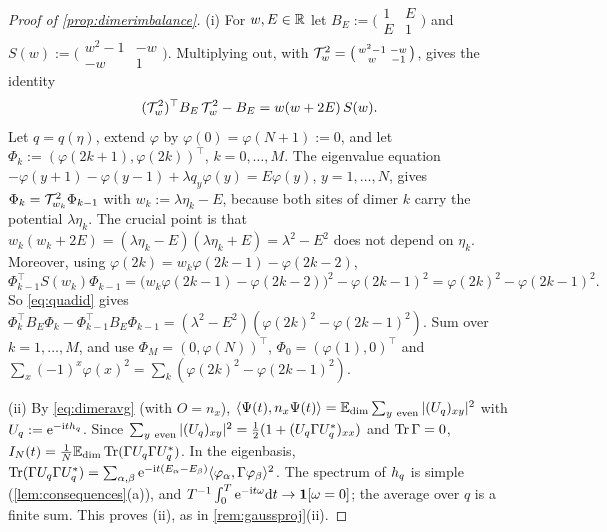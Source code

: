 \begin{proof}[Proof of \cref{prop:dimerimbalance}]
(i) For $w,E\in\mathbb{R}$ let $B_E:=\bigl(\begin{smallmatrix}1&E\\E&1\end{smallmatrix}\bigr)$ and
$S(w):=\bigl(\begin{smallmatrix}w^2-1&-w\\-w&1\end{smallmatrix}\bigr)$.  Multiplying out, with
$\mathcal{T}_w^2=\bigl(\begin{smallmatrix}w^2-1&-w\\w&-1\end{smallmatrix}\bigr)$, gives the identity
\begin{equation}\label{eq:quadid}
  (\mathcal{T}_w^2)^\top B_E\,\mathcal{T}_w^2-B_E=w(w+2E)\,S(w).
\end{equation}
Let $q=q(\eta)$, extend $\varphi$ by $\varphi(0)=\varphi(N+1):=0$, and let
$\Phi_k:=(\varphi(2k+1),\varphi(2k))^\top$, $k=0,\dots,M$.  The eigenvalue equation
$-\varphi(y+1)-\varphi(y-1)+\lambda q_y\varphi(y)=E\varphi(y)$, $y=1,\dots,N$, gives
$\Phi_k=\mathcal{T}_{w_k}^2\Phi_{k-1}$ with $w_k:=\lambda\eta_k-E$, because both sites of dimer $k$ carry the
potential $\lambda\eta_k$.  The crucial point is that $w_k(w_k+2E)=(\lambda\eta_k-E)(\lambda\eta_k+E)=\lambda^2-E^2$
does not depend on $\eta_k$.  Moreover, using $\varphi(2k)=w_k\varphi(2k-1)-\varphi(2k-2)$,
\[
  \Phi_{k-1}^\top S(w_k)\Phi_{k-1}=\bigl(w_k\varphi(2k-1)-\varphi(2k-2)\bigr)^2-\varphi(2k-1)^2=\varphi(2k)^2-\varphi(2k-1)^2 .
\]
So \eqref{eq:quadid} gives
$\Phi_k^\top B_E\Phi_k-\Phi_{k-1}^\top B_E\Phi_{k-1}=(\lambda^2-E^2)(\varphi(2k)^2-\varphi(2k-1)^2)$.  Sum
over $k=1,\dots,M$, and use $\Phi_M=(0,\varphi(N))^\top$, $\Phi_0=(\varphi(1),0)^\top$ and
$\sum_x(-1)^x\varphi(x)^2=\sum_k(\varphi(2k)^2-\varphi(2k-1)^2)$.

(ii) By \eqref{eq:dimeravg} (with $O=n_x$), $\langle\Psi(t),n_x\Psi(t)\rangle=\mathbb{E}_{\mathrm{dim}}\sum_{y\ \rm even}|(U_q)_{xy}|^2$
with $U_q:=\mathrm{e}^{-\mathrm{i} th_{q}}$.  Since $\sum_{y\ \rm even}|(U_q)_{xy}|^2=\frac12(1+(U_q\Gamma U_q^*)_{xx})$
and $\operatorname{Tr}\Gamma=0$, $I_N(t)=\frac1N\mathbb{E}_{\mathrm{dim}}\operatorname{Tr}(\Gamma U_q\Gamma U_q^*)$.  In the eigenbasis,
$\operatorname{Tr}(\Gamma U_q\Gamma U_q^*)=\sum_{\alpha,\beta}\mathrm{e}^{-\mathrm{i} t(E_\alpha-E_\beta)}\langle\varphi_\alpha,\Gamma\varphi_\beta\rangle^2$.  The
spectrum of $h_{q}$ is simple (\cref{lem:consequences}(a)), and $T^{-1}\int_0^T\mathrm{e}^{-\mathrm{i} t\omega}\mathrm{d} t\to\mathbf{1}[\omega=0]$;
the average over $q$ is a finite sum.  This proves (ii), as in \cref{rem:gaussproj}(ii).


\end{proof}

